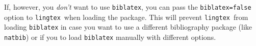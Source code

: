 \documentclass{article}
\def\lingtex{\texttt{lingtex}}
\begin{document}
If, however, you \emph{don't} want to use \texttt{biblatex}, you can pass the \verb|biblatex=false| option to \lingtex\ when loading the package. This will prevent \lingtex\ from loading \texttt{biblatex} in case you want to use a different bibliography package (like \texttt{natbib}) or if you to load \texttt{biblatex} manually with different options.
\end{document}
